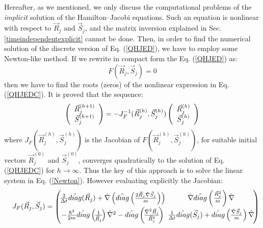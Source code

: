 \documentclass[nofootinbib, secnumarabic, amsmath, nobibnotes,11pt,aps,pra, floatfix]{revtex4-1}
\newcommand{\sref}[1]{Sec. \ref{#1}}
\newcommand{\eref}[1]{Eq. (\ref{#1})}
\begin{document}
Hereafter, as we mentioned, we only discuss the computational
problems of the \textit{implicit} solution of the Hamilton--Jacobi
equations. Such an equation is nonlinear with respect to $\vec
{R}_{j}$ and $\vec {S}_{j}$, and the matrix inversion explained in
\sref{timeindependentexplicit} cannot be done. Then, in order to
find the numerical solution of the discrete version of \eref{QHJED},
we have to employ some Newton-like method. If we rewrite in compact
form the \eref{QHJED} as:
\begin{equation}
F(\vec {R}_{j},\vec {S}_{j}) = 0 \label{QHJEDC}%
\end{equation}
then we have to find the roots (zeros) of the nonlinear expression in \eref{QHJEDC}. It is proved that the sequence:
\begin{equation}
\left(
\begin{array}
[c]{c}%
\vec {R}_{j}^{(h + 1)}\\
\vec {S}_{j}^{(h + 1)}%
\end{array}
\right) = -J_{F}^{-1}(\vec {R}_{j}^{(h)},\vec {S}_{j}^{(h)})\left(
\begin{array}
[c]{c}%
\vec {R}_{j}^{(h)}\\
\vec {S}_{j}^{(h)}%
\end{array}
\right) \label{Newton}%
\end{equation}
where $J_{F}(\vec {R}_{j}^{(h)},\vec {S}_{j}^{(h)})$ is the Jacobian
of $F(\vec {R}_{j}^{(h)},\vec {S}_{j}^{(h)})$, for suitable initial
vectors $\vec {R}_{j}^{(0)}$ and $\vec {S}_{j}^{(0)}$, converges quadratically  to
the solution of \eref{QHJEDC} for $h\rightarrow\infty$. Thus the key
of this approach is to solve the linear system in \eref{Newton}.
However evaluating explicitly the Jacobian:
{\begin{eqnarray}
&&J_{F}(\vec {R}_{j},\vec {S}_{j}) =\left(\!
\begin{array}
[c]{@{}c@{\ }c@{}}%
\frac{2}{\Delta t}\hat{diag}(\vec {R}_{j}) + \hat{\nabla}\left( \hat{diag}\left(\frac
{2\vec {R}_{j}\hat{\nabla}\vec {S}_{j}}{m}\right)\right) & \hat{\nabla
}\hat{diag}\left( \frac{\vec {R}_{j}^{2}}{m}\right) \hat{\nabla}\\
-\frac{\hbar^{2}}{2m}\hat{diag}\left(\! \frac{1}{\vec {R}_{j}}\!\right)
\hat{\nabla}^{2} - \hat{diag}\left(\! \frac{\hat{\nabla}^{2}\vec {R}_{j}}%
{\vec {R}_{j}^{2}}\!\right) & \frac{1}{\Delta t}\hat{diag}(\vec {S}%
_{j}) + \hat{diag}\left( \frac{\hat{\nabla}\vec {S}_{j}}{m}\right) \hat{\nabla}%
\end{array}\!
\right)\nonumber\\ 
\end{eqnarray}}
\end{document}
